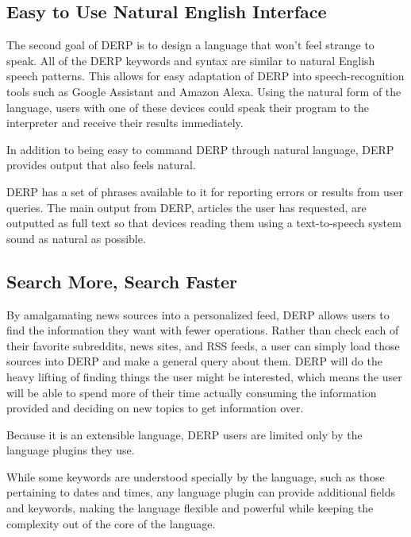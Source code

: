 \documentclass{article}
\begin{document}
\subsection{Easy to Use Natural English Interface}
The second goal of DERP is to design a language that won't feel strange to speak. All of the DERP keywords and syntax are similar to natural English speech patterns. This allows for easy adaptation of DERP into speech-recognition tools such as Google Assistant and Amazon Alexa. Using the natural form of the language, users with one of these devices could speak their program to the interpreter and receive their results immediately.

In addition to being easy to command DERP through natural language, DERP provides output that also feels natural.
\begin{comment}
@ADS - Is this something we're actually doing? We've kind of had it implied
in discussions, but never explicitly talked about it
\end{comment}
DERP has a set of phrases available to it for reporting errors or results from user queries. The main output from DERP, articles the user has requested, are outputted as full text so that devices reading them using a text-to-speech system sound as natural as possible.

\subsection{Search More, Search Faster}
By amalgamating news sources into a personalized feed, DERP allows users to find the information they want with fewer operations. Rather than check each of their favorite subreddits, news sites, and RSS feeds, a user can simply load those sources into DERP and make a general query about them. DERP will do the heavy lifting of finding things the user might be interested, which means the user will be able to spend more of their time actually consuming the information provided and deciding on new topics to get information over.

Because it is an extensible language, DERP users are limited only by the language plugins they use. 
\begin{comment}
@ADS Is this also something we officially decided on? I felt that we were leaning toward it
\end{comment}
While some keywords are understood specially by the language, such as those pertaining to dates and times, any language plugin can provide additional fields and keywords, making the language flexible and powerful while keeping the complexity out of the core of the language.
\end{document}

